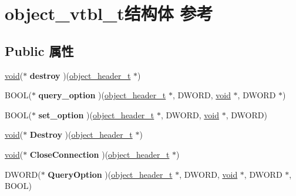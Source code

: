 \hypertarget{structobject__vtbl__t}{}\section{object\+\_\+vtbl\+\_\+t结构体 参考}
\label{structobject__vtbl__t}
\subsection*{Public 属性}
\begin{DoxyCompactItemize}
\item 
\mbox{\label{structobject__vtbl__t_a4f30e50bd01637c29ee2ee6a95ff677c}} 
\hyperlink{interfacevoid}{void}($\ast$ {\bfseries destroy} )(\hyperlink{struct__object__header__t}{object\+\_\+header\+\_\+t} $\ast$)
\item 
\mbox{\label{structobject__vtbl__t_af94503027118c2c7573e6eda830a912a}} 
B\+O\+OL($\ast$ {\bfseries query\+\_\+option} )(\hyperlink{struct__object__header__t}{object\+\_\+header\+\_\+t} $\ast$, D\+W\+O\+RD, \hyperlink{interfacevoid}{void} $\ast$, D\+W\+O\+RD $\ast$)
\item 
\mbox{\label{structobject__vtbl__t_ac1678697cc534f99d7e83c246a768210}} 
B\+O\+OL($\ast$ {\bfseries set\+\_\+option} )(\hyperlink{struct__object__header__t}{object\+\_\+header\+\_\+t} $\ast$, D\+W\+O\+RD, \hyperlink{interfacevoid}{void} $\ast$, D\+W\+O\+RD)
\item 
\mbox{\label{structobject__vtbl__t_a21ceeb30cb0271c6c82a5383107254f5}} 
\hyperlink{interfacevoid}{void}($\ast$ {\bfseries Destroy} )(\hyperlink{struct__object__header__t}{object\+\_\+header\+\_\+t} $\ast$)
\item 
\mbox{\label{structobject__vtbl__t_aa1ddd21eb927da7efbc24f98a27e34de}} 
\hyperlink{interfacevoid}{void}($\ast$ {\bfseries Close\+Connection} )(\hyperlink{struct__object__header__t}{object\+\_\+header\+\_\+t} $\ast$)
\item 
\mbox{\label{structobject__vtbl__t_a493c5ac17fa6c4a7c16f2e28a3581f38}} 
D\+W\+O\+RD($\ast$ {\bfseries Query\+Option} )(\hyperlink{struct__object__header__t}{object\+\_\+header\+\_\+t} $\ast$, D\+W\+O\+RD, \hyperlink{interfacevoid}{void} $\ast$, D\+W\+O\+RD $\ast$, B\+O\+OL)

\end{DoxyCompactItemize}
